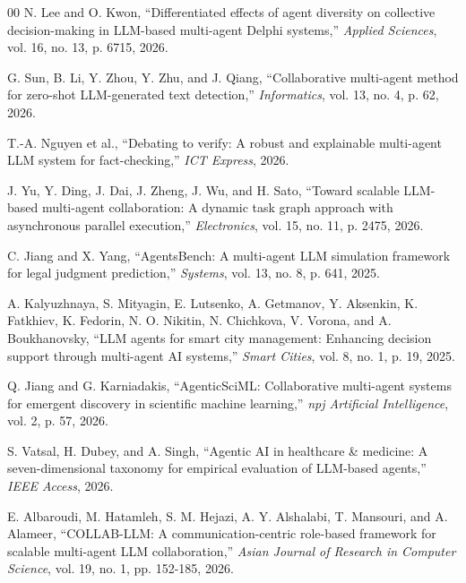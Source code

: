 \documentclass[conference]{IEEEtran}
\begin{document}
\begin{thebibliography}{00}
N. Lee and O. Kwon, ``Differentiated effects of agent diversity on collective decision-making in LLM-based multi-agent Delphi systems,'' \textit{Applied Sciences}, vol. 16, no. 13, p. 6715, 2026.

G. Sun, B. Li, Y. Zhou, Y. Zhu, and J. Qiang, ``Collaborative multi-agent method for zero-shot LLM-generated text detection,'' \textit{Informatics}, vol. 13, no. 4, p. 62, 2026.

T.-A. Nguyen et al., ``Debating to verify: A robust and explainable multi-agent LLM system for fact-checking,'' \textit{ICT Express}, 2026.

J. Yu, Y. Ding, J. Dai, J. Zheng, J. Wu, and H. Sato, ``Toward scalable LLM-based multi-agent collaboration: A dynamic task graph approach with asynchronous parallel execution,'' \textit{Electronics}, vol. 15, no. 11, p. 2475, 2026.

C. Jiang and X. Yang, ``AgentsBench: A multi-agent LLM simulation framework for legal judgment prediction,'' \textit{Systems}, vol. 13, no. 8, p. 641, 2025.

A. Kalyuzhnaya, S. Mityagin, E. Lutsenko, A. Getmanov, Y. Aksenkin, K. Fatkhiev, K. Fedorin, N. O. Nikitin, N. Chichkova, V. Vorona, and A. Boukhanovsky, ``LLM agents for smart city management: Enhancing decision support through multi-agent AI systems,'' \textit{Smart Cities}, vol. 8, no. 1, p. 19, 2025.

Q. Jiang and G. Karniadakis, ``AgenticSciML: Collaborative multi-agent systems for emergent discovery in scientific machine learning,'' \textit{npj Artificial Intelligence}, vol. 2, p. 57, 2026.

S. Vatsal, H. Dubey, and A. Singh, ``Agentic AI in healthcare \& medicine: A seven-dimensional taxonomy for empirical evaluation of LLM-based agents,'' \textit{IEEE Access}, 2026.

E. Albaroudi, M. Hatamleh, S. M. Hejazi, A. Y. Alshalabi, T. Mansouri, and A. Alameer, ``COLLAB-LLM: A communication-centric role-based framework for scalable multi-agent LLM collaboration,'' \textit{Asian Journal of Research in Computer Science}, vol. 19, no. 1, pp. 152-185, 2026.

\end{thebibliography}
\end{document}
